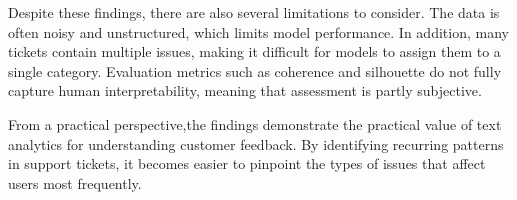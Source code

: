 Despite these findings, there are also several limitations to consider. The data is often noisy and unstructured, which limits model performance. In addition, many tickets contain multiple issues, making it difficult for models to assign them to a single category. Evaluation metrics such as coherence and silhouette do not fully capture human interpretability, meaning that assessment is partly subjective.

From a practical perspective,the findings demonstrate the practical value of text analytics for understanding customer feedback. By identifying recurring patterns in support tickets, it becomes easier to pinpoint the types of issues that affect users most frequently. 
